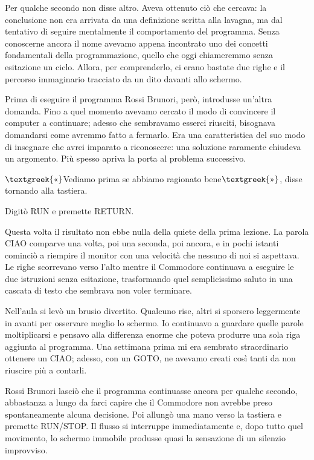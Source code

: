 \documentclass{article}
\begin{document}
Per qualche secondo non disse altro. Aveva ottenuto ciò che cercava: la conclusione non era arrivata da una definizione
scritta alla lavagna, ma dal tentativo di seguire mentalmente il comportamento del programma. Senza conoscerne ancora
il nome avevamo appena incontrato uno dei concetti fondamentali della programmazione, quello che oggi chiameremmo senza
esitazione un ciclo. Allora, per comprenderlo, ci erano bastate due righe e il percorso immaginario tracciato da un
dito davanti allo schermo.

Prima di eseguire il programma Rossi Brunori, però, introdusse un'altra domanda. Fino a quel momento avevamo cercato il
modo di convincere il computer a continuare; adesso che sembravamo esserci riusciti, bisognava domandarsi come avremmo
fatto a fermarlo. Era una caratteristica del suo modo di insegnare che avrei imparato a riconoscere: una soluzione
raramente chiudeva un argomento. Più spesso apriva la porta al problema successivo.

$\text{\textgreek{«}}$Vediamo prima se abbiamo ragionato bene$\text{\textgreek{»}}$, disse tornando alla tastiera.

Digitò RUN e premette RETURN.

Questa volta il risultato non ebbe nulla della quiete della prima lezione. La parola CIAO comparve una volta, poi una
seconda, poi ancora, e in pochi istanti cominciò a riempire il monitor con una velocità che nessuno di noi si
aspettava. Le righe scorrevano verso l'alto mentre il Commodore continuava a eseguire le due istruzioni senza
esitazione, trasformando quel semplicissimo saluto in una cascata di testo che sembrava non voler terminare.

Nell'aula si levò un brusio divertito. Qualcuno rise, altri si sporsero leggermente in avanti per osservare meglio lo
schermo. Io continuavo a guardare quelle parole moltiplicarsi e pensavo alla differenza enorme che poteva produrre una
sola riga aggiunta al programma. Una settimana prima mi era sembrato straordinario ottenere un CIAO; adesso, con un
GOTO, ne avevamo creati così tanti da non riuscire più a contarli.

Rossi Brunori lasciò che il programma continuasse ancora per qualche secondo, abbastanza a lungo da farci capire che il
Commodore non avrebbe preso spontaneamente alcuna decisione. Poi allungò una mano verso la tastiera e premette
RUN/STOP. Il flusso si interruppe immediatamente e, dopo tutto quel movimento, lo schermo immobile produsse quasi la
sensazione di un silenzio improvviso.
\end{document}
